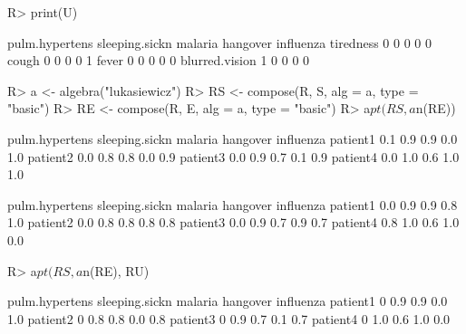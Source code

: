 \documentclass{article}\usepackage[]{graphicx}\usepackage[]{color}
\begin{document}
\begin{Schunk}
% --begin: "comp.u"
\begin{Sinput}
R> print(U)
\end{Sinput}
\begin{Soutput}
               pulm.hypertens sleeping.sickn malaria hangover influenza
tiredness                   0              0       0        0         0
cough                       0              0       0        0         1
fever                       0              0       0        0         0
blurred.vision              1              0       0        0         0
\end{Soutput}
%
% --end: "comp.u"
\end{Schunk}

\begin{Schunk}
% --begin: "comp.circ.excl"
\begin{Sinput}
R> a <- algebra("lukasiewicz")
R> RS <- compose(R, S, alg = a, type = "basic")
R> RE <- compose(R, E, alg = a, type = "basic")
R> a$pt(RS, a$n(RE))
\end{Sinput}
\begin{Soutput}
         pulm.hypertens sleeping.sickn malaria hangover influenza
patient1            0.1            0.9     0.9      0.0       1.0
patient2            0.0            0.8     0.8      0.0       0.9
patient3            0.0            0.9     0.7      0.1       0.9
patient4            0.0            1.0     0.6      1.0       1.0
\end{Soutput}
%
% --end: "comp.circ.excl"
\end{Schunk}

\begin{Schunk}
% --begin: "comp.circ.unavoid"
\begin{Soutput}
         pulm.hypertens sleeping.sickn malaria hangover influenza
patient1            0.0            0.9     0.9      0.8       1.0
patient2            0.0            0.8     0.8      0.8       0.8
patient3            0.0            0.9     0.7      0.9       0.7
patient4            0.8            1.0     0.6      1.0       0.0
\end{Soutput}
%
% --end: "comp.circ.unavoid"
\end{Schunk}

\begin{Schunk}
% --begin: "comp.circ.excl.unavoid"
\begin{Sinput}
R> a$pt(RS, a$n(RE), RU)
\end{Sinput}
\begin{Soutput}
         pulm.hypertens sleeping.sickn malaria hangover influenza
patient1              0            0.9     0.9      0.0       1.0
patient2              0            0.8     0.8      0.0       0.8
patient3              0            0.9     0.7      0.1       0.7
patient4              0            1.0     0.6      1.0       0.0
\end{Soutput}
%
% --end: "comp.circ.excl.unavoid"
\end{Schunk}
\end{document}
